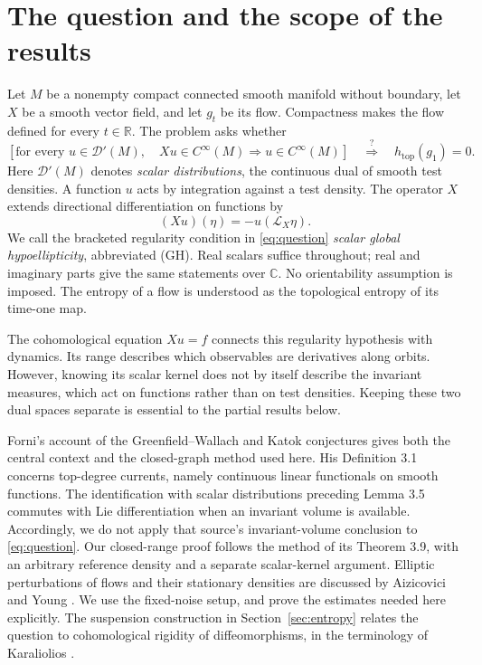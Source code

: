 \documentclass[11pt]{article}
\theoremstyle{definition}
\theoremstyle{remark}
\newcommand{\R}{\mathbb R}
\newcommand{\D}{\mathcal D'}
\newcommand{\htop}{h_{\mathrm{top}}}
\begin{document}
\section{The question and the scope of the results}

Let $M$ be a nonempty compact connected smooth manifold without boundary, let $X$ be a smooth vector field, and let $g_t$ be its flow. Compactness makes the flow defined for every $t\in\R$. The problem asks whether
\begin{equation}\label{eq:question}
 \left[\text{for every }u\in\D(M),\quad
 Xu\in C^\infty(M)\Longrightarrow u\in C^\infty(M)\right]
 \quad\stackrel{?}{\Longrightarrow}\quad \htop(g_1)=0.
\end{equation}
Here $\D(M)$ denotes \emph{scalar distributions}, the continuous dual of smooth test densities. A function $u$ acts by integration against a test density. The operator $X$ extends directional differentiation on functions by
\[
 (Xu)(\eta)=-u(\mathcal L_X\eta).
\]
We call the bracketed regularity condition in \eqref{eq:question} \emph{scalar global hypoellipticity}, abbreviated (GH). Real scalars suffice throughout; real and imaginary parts give the same statements over $\mathbb C$. No orientability assumption is imposed. The entropy of a flow is understood as the topological entropy of its time-one map.

The cohomological equation $Xu=f$ connects this regularity hypothesis with dynamics. Its range describes which observables are derivatives along orbits. However, knowing its scalar kernel does not by itself describe the invariant measures, which act on functions rather than on test densities. Keeping these two dual spaces separate is essential to the partial results below.

Forni's account of the Greenfield--Wallach and Katok conjectures \cite{Forni} gives both the central context and the closed-graph method used here. His Definition 3.1 concerns top-degree currents, namely continuous linear functionals on smooth functions. The identification with scalar distributions preceding Lemma 3.5 commutes with Lie differentiation when an invariant volume is available. Accordingly, we do not apply that source's invariant-volume conclusion to \eqref{eq:question}. Our closed-range proof follows the method of its Theorem 3.9, with an arbitrary reference density and a separate scalar-kernel argument. Elliptic perturbations of flows and their stationary densities are discussed by Aizicovici and Young \cite{AY}. We use the fixed-noise setup, and prove the estimates needed here explicitly. The suspension construction in Section~\ref{sec:entropy} relates the question to cohomological rigidity of diffeomorphisms, in the terminology of Karaliolios \cite[\S1.1]{Kar}.
\end{document}
